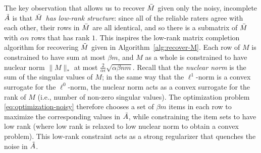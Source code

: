 The key observation that allows us to recover $\bar{M}$ given only the noisy, 
incomplete $\tilde{A}$ is that \emph{$\bar{M}$ has low-rank structure}: since all 
of the reliable raters agree with each other, their rows in $\bar{M}$ are all 
identical, and so there is a submatrix of $\bar{M}$ with $\alpha n$ rows that has 
rank $1$. This inspires the low-rank matrix completion algorithm for recovering 
$\tilde{M}$ given in Algorithm~\ref{alg:recover-M}. Each row of $M$ is constrained 
to have sum at most $\beta m$, and $M$ as a whole is constrained to have 
nuclear norm $\|M\|_*$ at most $\frac{2}{\alpha \epsilon}\sqrt{\alpha\beta nm}$. 
Recall that the \emph{nuclear norm} is the sum of the singular values of 
$M$; in the same way that the $\ell^1$-norm is a convex surrogate for the 
$\ell^0$-norm, the nuclear norm acts as a convex surrogate for the rank of $M$ 
(i.e., number of non-zero singular values). The optimization problem 
\eqref{eq:optimization-noisy} therefore chooses a set of $\beta m$ items in each 
row to maximize the corresponding values in $\tilde{A}$, while constraining the item 
sets to have low rank (where low rank is relaxed to low nuclear norm to obtain 
a convex problem). 
This low-rank constraint acts as a strong regularizer that quenches the noise 
in $\tilde{A}$.

